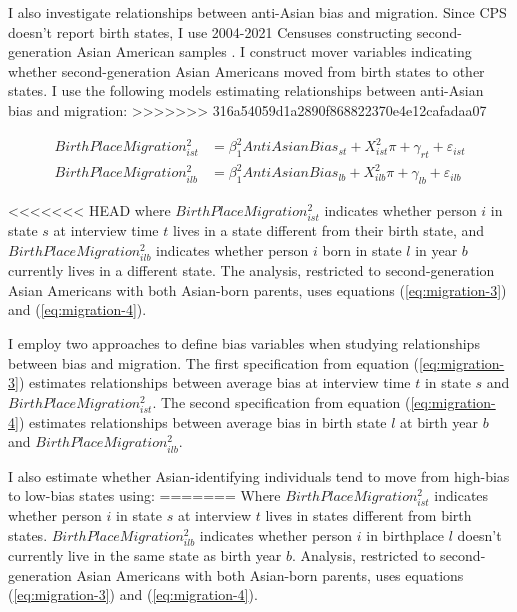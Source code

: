 I also investigate relationships between anti-Asian bias and migration. Since CPS doesn't report birth states, I use 2004-2021 Censuses constructing second-generation Asian American samples \autocite{floodsarahIntegratedPublicUse2021}. I construct mover variables indicating whether second-generation Asian Americans moved from birth states to other states. I use the following models estimating relationships between anti-Asian bias and migration:
>>>>>>> 316a54059d1a2890f868822370e4e12cafadaa07

\begin{align}
BirthPlaceMigration_{ist}^2 &= \beta_1^2 AntiAsianBias_{st} 
                   + X_{ist}^2\pi + \gamma_{rt} 
                   + \varepsilon_{ist} \label{eq:migration-3} \\
BirthPlaceMigration_{ilb}^2 &= \beta_1^2 AntiAsianBias_{lb} 
                   + X_{ilb}^2\pi + \gamma_{lb} 
                   + \varepsilon_{ilb} \label{eq:migration-4}
\end{align}

<<<<<<< HEAD
where $BirthPlaceMigration_{ist}^2$ indicates whether person $i$ in state $s$ at interview time $t$ lives in a state different from their birth state, and $BirthPlaceMigration_{ilb}^2$ indicates whether person $i$ born in state $l$ in year $b$ currently lives in a different state. The analysis, restricted to second-generation Asian Americans with both Asian-born parents, uses equations (\ref{eq:migration-3}) and (\ref{eq:migration-4}).

I employ two approaches to define bias variables when studying relationships between bias and migration. The first specification from equation (\ref{eq:migration-3}) estimates relationships between average bias at interview time $t$ in state $s$ and $BirthPlaceMigration_{ist}^2$. The second specification from equation (\ref{eq:migration-4}) estimates relationships between average bias in birth state $l$ at birth year $b$ and $BirthPlaceMigration_{ilb}^2$.

I also estimate whether Asian-identifying individuals tend to move from high-bias to low-bias states using:
=======
Where $BirthPlaceMigration_{ist}^2$ indicates whether person $i$ in state $s$ at interview $t$ lives in states different from birth states. $BirthPlaceMigration_{ilb}^2$ indicates whether person $i$ in birthplace $l$ doesn't currently live in the same state as birth year $b$. Analysis, restricted to second-generation Asian Americans with both Asian-born parents, uses equations (\ref{eq:migration-3}) and (\ref{eq:migration-4}).

